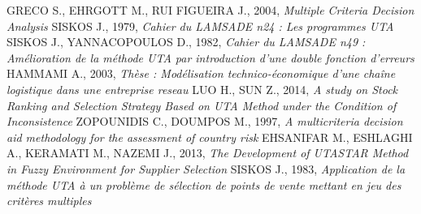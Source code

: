 \documentclass{report}
\begin{document}
\begin{thebibliography}{9}
 GRECO S., EHRGOTT M., RUI FIGUEIRA J., 2004, \textit{Multiple Criteria Decision Analysis}
 SISKOS J., 1979, \textit{Cahier du LAMSADE n24 : Les programmes UTA}
 SISKOS J., YANNACOPOULOS D., 1982, \textit{Cahier du LAMSADE n49 : Amélioration de la méthode UTA par introduction d’une double fonction d’erreurs}
 HAMMAMI A., 2003, \textit{Thèse : Modélisation technico-économique d’une chaîne logistique dans une entreprise reseau}
 LUO H., SUN Z., 2014, \textit{A study on Stock Ranking and Selection Strategy Based on UTA Method under the Condition of Inconsistence}
 ZOPOUNIDIS C., DOUMPOS M., 1997, \textit{A multicriteria decision aid methodology for the assessment of country risk}
 EHSANIFAR M., ESHLAGHI A., KERAMATI M., NAZEMI J., 2013, \textit{The Development of UTASTAR Method in Fuzzy Environment for Supplier Selection}
 SISKOS J., 1983, \textit{Application de la méthode UTA à un problème de sélection de points de vente mettant en jeu des critères multiples}
\end{thebibliography}
\end{document}
